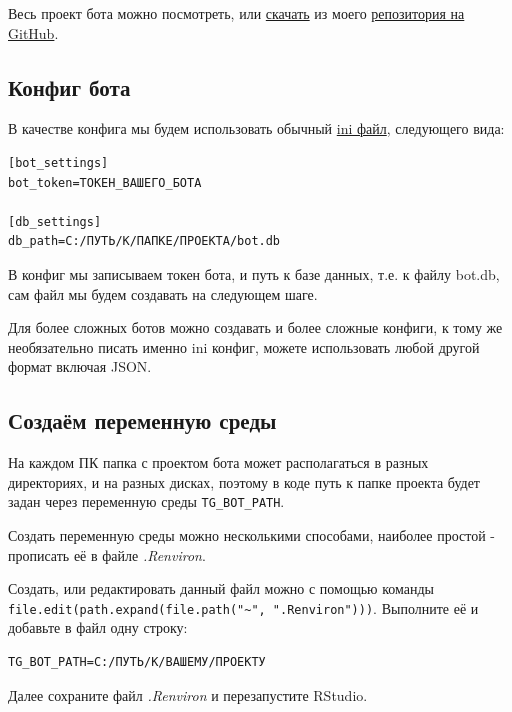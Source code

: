 \documentclass[
]{book}
\begin{document}
Весь проект бота можно посмотреть, или \href{https://github.com/selesnow/logical_tg_bot/archive/master.zip}{скачать} из моего \href{https://github.com/selesnow/logical_tg_bot}{репозитория на GitHub}.

\subsection{Конфиг бота}\label{ux43aux43eux43dux444ux438ux433-ux431ux43eux442ux430}

В качестве конфига мы будем использовать обычный \href{https://ru.wikipedia.org/wiki/.ini}{ini файл}, следующего вида:

\begin{verbatim}
[bot_settings]
bot_token=ТОКЕН_ВАШЕГО_БОТА

[db_settings]
db_path=C:/ПУТЬ/К/ПАПКЕ/ПРОЕКТА/bot.db
\end{verbatim}

В конфиг мы записываем токен бота, и путь к базе данных, т.е. к файлу bot.db, сам файл мы будем создавать на следующем шаге.

Для более сложных ботов можно создавать и более сложные конфиги, к тому же необязательно писать именно ini конфиг, можете использовать любой другой формат включая JSON.

\subsection{Создаём переменную среды}\label{ux441ux43eux437ux434ux430ux451ux43c-ux43fux435ux440ux435ux43cux435ux43dux43dux443ux44e-ux441ux440ux435ux434ux44b}

На каждом ПК папка с проектом бота может располагаться в разных директориях, и на разных дисках, поэтому в коде путь к папке проекта будет задан через переменную среды \texttt{TG\_BOT\_PATH}.

Создать переменную среды можно несколькими способами, наиболее простой - прописать её в файле \emph{.Renviron}.

Создать, или редактировать данный файл можно с помощью команды \texttt{file.edit(path.expand(file.path("\textasciitilde{}",\ ".Renviron")))}. Выполните её и добавьте в файл одну строку:

\begin{verbatim}
TG_BOT_PATH=C:/ПУТЬ/К/ВАШЕМУ/ПРОЕКТУ
\end{verbatim}

Далее сохраните файл \emph{.Renviron} и перезапустите RStudio.
\end{document}
